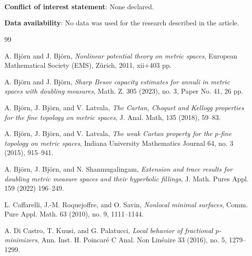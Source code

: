 \documentclass[11pt,leqno]{amsart}
\numberwithin{equation}{section}
\theoremstyle{definition}
\begin{document}
	
	
	
	
	\
	
	\
	
	\
	
	
	{\bf Conflict of interest statement}: None declared.
	
	{\bf Data availability}: 
	No data was used for the research described in the article.
	
	
	\newcommand{\etalchar}[1]{$^{#1}$}
	\begin{thebibliography}{99}
		
		
		
		A. Bj\"orn and J. Bj\"orn,
		\textit{ Nonlinear potential theory on metric spaces},
		European Mathematical Society (EMS), Zürich, 2011, xii+403 pp.
		
		A. Bj\"orn and J. Bj\"orn,
		\textit{Sharp Besov capacity estimates for annuli in metric spaces with doubling measures}, 
		Math. Z. 305 (2023), no. 3, Paper No. 41, 26 pp.
		
		A. Bj\"orn, J. Bj\"orn, and V. Latvala,
		\textit{The Cartan, Choquet and Kellogg properties for the fine topology on metric spaces},
		J. Anal. Math, 135 (2018), 59--83. 
		
		A. Bj\"orn, J. Bj\"orn, and V. Latvala,
		\textit{The weak Cartan property for the $p$-fine topology on metric spaces},
		Indiana University Mathematics Journal 64, no. 3 (2015), 915--941.
		
		A. Bj\"orn, J. Bj\"orn, and N. Shanmugalingam,
		\textit{Extension and trace results for doubling metric measure spaces and their hyperbolic fillings},
		J. Math. Pures Appl. 159 (2022) 196--249.
		
		L. Caffarelli, J.-M.  Roquejoffre, and O. Savin,
		\textit{Nonlocal minimal surfaces},
		Comm. Pure Appl. Math. 63 (2010), no. 9, 1111--1144.
		
		A. Di Castro, T. Kuusi, and G. Palatucci,
		\textit{Local behavior of fractional  $p$-minimizers},
		Ann. Inst. H. Poincaré C Anal. Non Linéaire 33 (2016), no. 5, 1279--1299.
		

\end{thebibliography}
\end{document}
